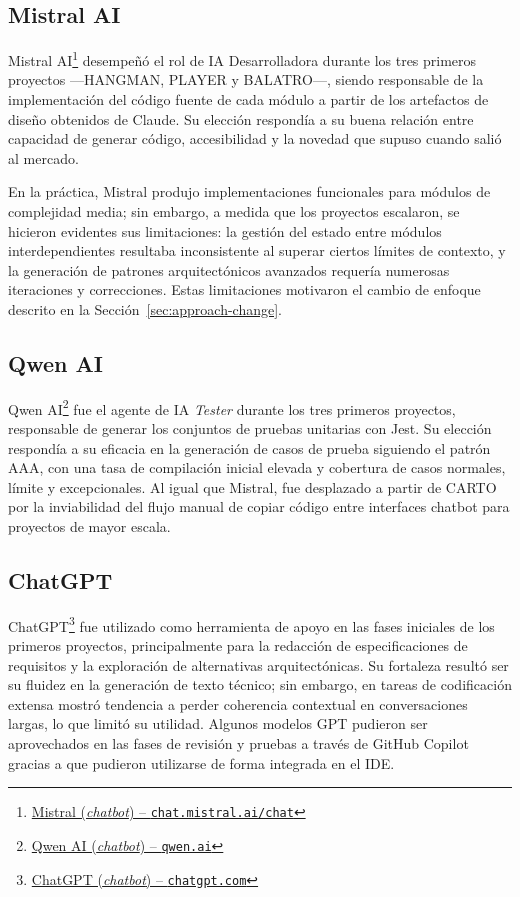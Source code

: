 \subsection{Mistral AI} \label{subsec:mistral}
Mistral AI\footnote{\href{https://chat.mistral.ai/chat}{Mistral (\textit{chatbot}) -- \texttt{chat.mistral.ai/chat}}} desempeñó el rol de \ac{IA} Desarrolladora durante los tres primeros proyectos ---\ac{HANGMAN}, \ac{PLAYER} y \ac{BALATRO}---, siendo responsable de la implementación del código fuente de cada módulo a partir de los artefactos de diseño obtenidos de Claude. Su elección respondía a su buena relación entre capacidad de generar código, accesibilidad y la novedad que supuso cuando salió al mercado.

En la práctica, Mistral produjo implementaciones funcionales para módulos de complejidad media; sin embargo, a medida que los proyectos escalaron, se hicieron evidentes sus limitaciones: la gestión del estado entre módulos interdependientes resultaba inconsistente al superar ciertos límites de contexto, y la generación de patrones arquitectónicos avanzados requería numerosas iteraciones y correcciones. Estas limitaciones motivaron el cambio de enfoque descrito en la Sección~\ref{sec:approach-change}.

\subsection{Qwen AI} \label{subsec:qwen}

Qwen AI\footnote{\href{https://qwen.ai/home}{Qwen AI (\textit{chatbot}) -- \texttt{qwen.ai}}} fue el agente de \ac{IA} \textit{Tester} durante los tres primeros proyectos, responsable de generar los conjuntos de pruebas unitarias con Jest. Su elección respondía a su eficacia en la generación de casos de prueba siguiendo el patrón \ac{AAA}, con una tasa de compilación inicial elevada y cobertura de casos normales, límite y excepcionales.
Al igual que Mistral, fue desplazado a partir de \ac{CARTO} por la inviabilidad del flujo manual de copiar código entre interfaces chatbot para proyectos de mayor escala.

\subsection{ChatGPT} \label{subsec:chatgpt}

ChatGPT\footnote{\href{https://chatgpt.com}{ChatGPT (\textit{chatbot}) -- \texttt{chatgpt.com}}} fue utilizado como herramienta de apoyo en las fases iniciales de los primeros proyectos, principalmente para la redacción de especificaciones de requisitos y la exploración de alternativas arquitectónicas.
Su fortaleza resultó ser su fluidez en la generación de texto técnico; sin embargo, en tareas de codificación extensa mostró tendencia a perder coherencia contextual en conversaciones largas, lo que limitó su utilidad.
Algunos modelos GPT pudieron ser aprovechados en las fases de revisión y pruebas  a través de GitHub Copilot gracias a que pudieron utilizarse de forma integrada en el \ac{IDE}.

